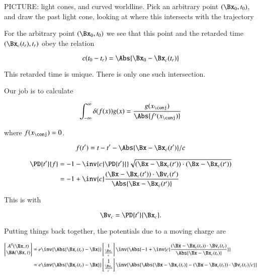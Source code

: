 PICTURE: light cones, and curved worldline.  Pick an arbitrary point $(\Bx_0, t_0)$, and draw the past light cone, looking at where this intersects with the trajectory

For the arbitrary point $(\Bx_0, t_0)$ we see that this point and the retarded time $(\Bx_c(t_r), t_r)$ obey the relation

\begin{equation}\label{eqn:relativisticElectrodynamicsL18:190}
c (t_0 - t_r) = \Abs{\Bx_0 - \Bx_c(t_r)}
\end{equation}

This retarded time is unique.  There is only one such intersection.

Our job is to calculate

\begin{equation}\label{eqn:relativisticElectrodynamicsL18:210}
\int_{-\infty}^\infty \delta(f(x)) g(x) = \frac{g(x_\conj)}{\Abs{f'(x_\conj)}}
\end{equation}

where $f(x_\conj) = 0$.

\begin{equation}\label{eqn:relativisticElectrodynamicsL18:230}
f(t') = t - t' - \Abs{\Bx - \Bx_c(t')}/c
\end{equation}

\begin{align*}
\PD{t'}{f}
&= -1 - \inv{c} \PD{t'}{} \sqrt{ (\Bx - \Bx_c(t')) \cdot (\Bx - \Bx_c(t')) } \\
&= -1 + \inv{c} \frac{(\Bx - \Bx_c(t')) \cdot \Bv_c(t')}{\Abs{\Bx - \Bx_c(t')}} 
\end{align*}

This is with

\begin{equation}\label{eqn:relativisticElectrodynamicsL18:700}
\Bv_c = \PD{t'}{\Bx_c}.
\end{equation}

Putting things back together, the potentials due to a moving charge are 

\begin{align*}
\begin{bmatrix}
A^0(\Bx, t) \\
\BA(\Bx, t)
\end{bmatrix}
&=
e \inv{\Abs{\Bx_c(t_r) - \Bx}}
\begin{bmatrix}
1 \\
\frac{\Bv_c}{c}
\end{bmatrix}
\inv{\Abs{
-1 + \inv{c} \frac{(\Bx - \Bx_c(t_r)) \cdot \Bv_c(t_r)}{\Abs{\Bx - \Bx_c(t_r)}} 
}
} \\
&=
e \inv{\Abs{\Bx_c(t_r) - \Bx}}
\begin{bmatrix}
1 \\
\frac{\Bv_c}{c}
\end{bmatrix}
\inv{\Abs{
\Abs{\Bx - \Bx_c(t_r)} - (\Bx - \Bx_c(t_r)) \cdot \Bv_c(t_r)/c
} }
\end{align*}

